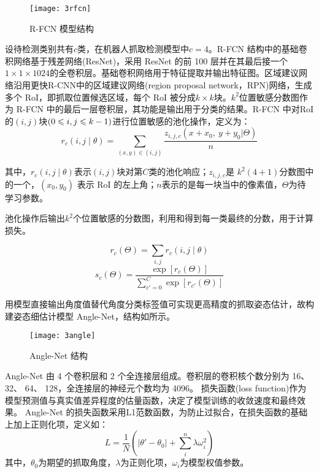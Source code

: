\documentclass{yangthesis}
\begin{document}
\begin{figure}[!htbp]
	\centering
	\texttt{[image: 3rfcn]}
	\caption{R-FCN 模型结构}
     \label{figrfcn}
\end{figure}

设待检测类别共有$c$类，在机器人抓取检测模型中$c = 4$。R-FCN 结构中的基础卷积网络基于残差网络(ResNet)，采用 ResNet 的前 100 层并在其最后接一个$1\times1\times1024$的全卷积层。基础卷积网络用于特征提取并输出特征图。区域建议网络沿用更快R-CNN中的区域建议网络(region proposal network，RPN)网络，生成多个 RoI，即抓取位置候选区域，每个 RoI 被分成$k\times k$块。$k^2$位置敏感分数图作为 R-FCN 中的最后一层卷积层，其功能是输出用于分类的结果。R-FCN 中对RoI 的$(i, j)$块$(0\leqslant i, j\leqslant k-1)$进行位置敏感的池化操作，定义为：
\begin{equation}
r_c(i,j\mid\theta)=\sum_{(x,y)\in(i,j)}\frac{z_{i,j,c}(x+x_0,\ y+y_0|\Theta)}{n}
\label{eqrcijt}
\end{equation}

其中，$r_c(i,j\mid\theta)$表示$ (i, j) $块对第$ C $类的池化响应；$z_{i,j,c}$是 $k^2(4 + 1)$分数图中的一个，$(x_0, y_0)$ 表示 RoI 的左上角；$n$表示的是每一块当中的像素值，$\Theta$为待学习参数。

池化操作后输出$k^2$个位置敏感的分数图，利用和得到每一类最终的分数，用于计算损失。

\begin{equation}
r_c(\Theta)=\sum_{i,j}r_c(i,j\mid\theta)
\label{eqrc}
\end{equation}
\begin{equation}
s_c(\Theta)=\dfrac{\exp[{r_c(\Theta)}]}{\sum\limits_{c'=0}^C\exp[{r_{c'}(\Theta)}]}
\label{eqsc}
\end{equation}

用模型直接输出角度值替代角度分类标签值可实现更高精度的抓取姿态估计，故构建姿态细估计模型 Angle-Net，结构如所示。

\begin{figure}[!htbp]
	\centering
	\texttt{[image: 3angle]}
	\caption{Angle-Net 结构}
     \label{figangle}
\end{figure}

Angle-Net 由 4 个卷积层和 2 个全连接层组成。卷积层的卷积核个数分别为 16、 32、 64、 128，全连接层的神经元个数均为 4096。 损失函数(loss function)作为模型预测值与真实值差异程度的估量函数，决定了模型训练的收敛速度和最终效果。 Angle-Net 的损失函数采用L1范数函数，为防止过拟合，在损失函数的基础上加上正则化项，定义如：
\begin{equation}
L=\frac{1}{N}\left(\Big|\theta'-\theta_0\Big|+\sum\limits_i^n\lambda\omega_i^2\right)
\label{eqnor}
\end{equation}
其中，$\theta_0$为期望的抓取角度，$\lambda$为正则化项，$\omega_i$为模型权值参数。
\end{document}
